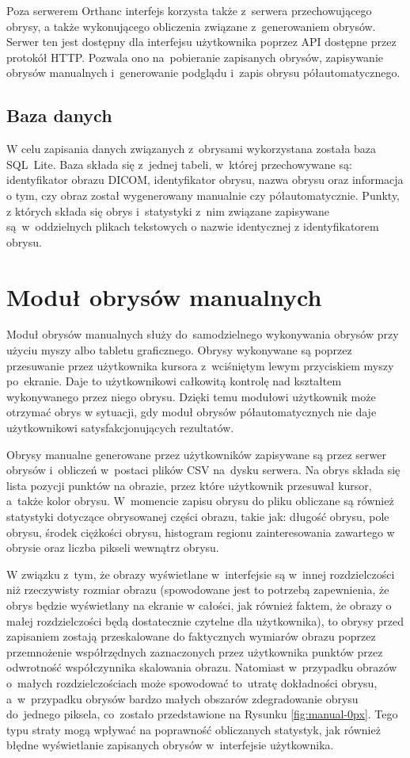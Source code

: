 \documentclass[a4paper,11pt,twoside,openright]{report}
\theoremstyle{definition}
\begin{document}
Poza serwerem Orthanc interfejs korzysta także z~serwera przechowującego obrysy,
a także wykonującego obliczenia związane z~generowaniem obrysów. Serwer ten jest
dostępny dla interfejsu użytkownika poprzez API dostępne przez protokół HTTP.
Pozwala ono na~pobieranie zapisanych obrysów, zapisywanie obrysów manualnych
i~generowanie podglądu i~zapis obrysu półautomatycznego.

\subsection {Baza danych}

W celu zapisania danych związanych z~obrysami wykorzystana została baza SQL~Lite.
Baza składa się z~jednej tabeli, w~której przechowywane są: identyfikator obrazu DICOM,
identyfikator obrysu, nazwa obrysu oraz informacja o tym, czy obraz został wygenerowany
manualnie czy półautomatycznie. Punkty, z których składa się obrys i~statystyki
z~nim związane zapisywane są~w~oddzielnych
plikach tekstowych o nazwie identycznej z identyfikatorem obrysu.

\section {Moduł obrysów manualnych}

Moduł obrysów manualnych służy do~samodzielnego wykonywania obrysów przy użyciu myszy albo tabletu
graficznego. Obrysy wykonywane są poprzez przesuwanie przez użytkownika kursora
z~wciśniętym lewym przyciskiem myszy po~ekranie. Daje to użytkownikowi całkowitą
kontrolę nad kształtem wykonywanego przez niego obrysu. Dzięki temu modułowi
użytkownik może otrzymać obrys w sytuacji,
gdy moduł obrysów półautomatycznych nie daje użytkownikowi satysfakcjonujących rezultatów.

Obrysy manualne generowane przez użytkowników zapisywane są przez serwer obrysów
i~obliczeń w~postaci plików CSV na~dysku serwera. Na obrys składa się lista
pozycji punktów na obrazie, przez które użytkownik przesuwał kursor, a~także kolor obrysu.
W~momencie zapisu obrysu do pliku obliczane są
również statystyki dotyczące obrysowanej części obrazu, takie jak: długość obrysu,
pole obrysu, środek ciężkości obrysu, histogram regionu zainteresowania zawartego w obrysie oraz
liczba pikseli wewnątrz obrysu.

W związku z~tym, że obrazy wyświetlane w~interfejsie są w~innej rozdzielczości
niż rzeczywisty rozmiar obrazu (spowodowane jest to potrzebą zapewnienia, że obrys
będzie wyświetlany na ekranie w całości, jak również faktem, że obrazy o małej rozdzielczości
będą dostatecznie czytelne dla użytkownika), to obrysy przed zapisaniem zostają przeskalowane do
faktycznych wymiarów obrazu poprzez przemnożenie współrzędnych zaznaczonych przez
użytkownika punktów przez odwrotność współczynnika skalowania obrazu.
Natomiast w~przypadku obrazów o~małych rozdzielczościach może
spowodować to~utratę dokładności obrysu, a~w~przypadku obrysów bardzo małych
obszarów zdegradowanie obrysu do~jednego piksela, co~zostało przedstawione na Rysunku
\ref{fig:manual-0px}. Tego typu straty mogą wpływać
na poprawność obliczanych statystyk, jak również błędne wyświetlanie zapisanych
obrysów w~interfejsie użytkownika.
\end{document}
